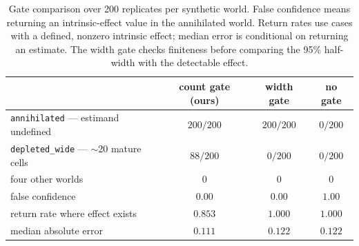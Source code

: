 \begin{table}[htbp]
\small
\centering
\caption{Gate comparison over 200 replicates per synthetic world.
False confidence means returning an intrinsic-effect value in the annihilated
world. Return rates use cases with a defined, nonzero intrinsic effect; median
error is conditional on returning an estimate.
The width gate checks finiteness before comparing the 95\% half-width with the
detectable effect. }
\label{tab:bench}
\begin{tabular}{@{}lccc@{}}
\toprule
& \textbf{count gate (ours)} & \textbf{width gate} & \textbf{no gate} \\
\midrule
\texttt{annihilated} --- estimand undefined & $200/200$ & $200/200$ & $0/200$ \\
\texttt{depleted\_wide} --- $\sim$20 mature cells & $88/200$ & $0/200$ & $0/200$ \\
four other worlds & 0 & 0 & 0 \\
\midrule
false confidence & $0.00$ & $0.00$ & $1.00$ \\
return rate where effect exists & $0.853$ & $1.000$ & $1.000$ \\
median absolute error & $0.111$ & $0.122$ & $0.122$ \\
\bottomrule
\end{tabular}
\end{table}
